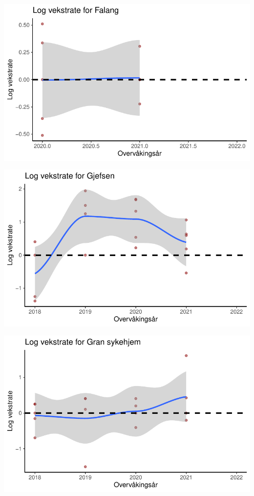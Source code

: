 \documentclass[
  letterpaper,
  DIV=11,
  numbers=noendperiod]{scrreport}
\begin{document}
\includegraphics{growthRate_files/figure-pdf/unnamed-chunk-3-2.pdf}

\includegraphics{growthRate_files/figure-pdf/unnamed-chunk-3-3.pdf}

\includegraphics{growthRate_files/figure-pdf/unnamed-chunk-3-4.pdf}
\end{document}
